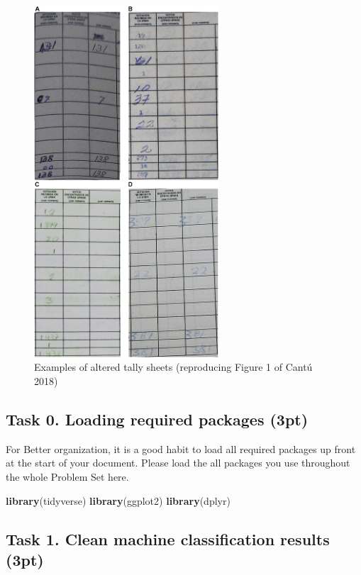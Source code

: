 \documentclass[
]{article}
\newenvironment{Shaded}{\begin{snugshade}}{\end{snugshade}}
\newcommand{\FunctionTok}[1]{\textcolor[rgb]{0.13,0.29,0.53}{\textbf{#1}}}
\newcommand{\NormalTok}[1]{#1}
\begin{document}
\begin{figure}
\centering
\includegraphics[width=2.70833in,height=\textheight]{image/fraud.png}
\caption{Examples of altered tally sheets (reproducing Figure 1 of Cantú
2018)}
\end{figure}

\clearpage

\hypertarget{task-0.-loading-required-packages-3pt}{%
\subsection{Task 0. Loading required packages
(3pt)}\label{task-0.-loading-required-packages-3pt}}

For Better organization, it is a good habit to load all required
packages up front at the start of your document. Please load the all
packages you use throughout the whole Problem Set here.

\begin{Shaded}
\begin{Highlighting}[]
\FunctionTok{library}\NormalTok{(tidyverse)}
\FunctionTok{library}\NormalTok{(ggplot2)}
\FunctionTok{library}\NormalTok{(dplyr)}
\end{Highlighting}
\end{Shaded}

\clearpage

\hypertarget{task-1.-clean-machine-classification-results-3pt}{%
\subsection{Task 1. Clean machine classification results
(3pt)}\label{task-1.-clean-machine-classification-results-3pt}}
\end{document}
